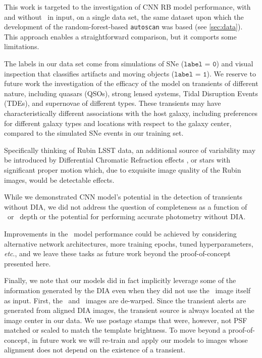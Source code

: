 This work is targeted to the investigation of CNN RB model performance, with and without \diff\ in input, on a single data set, the same dataset upon which the  development of the random-forest-based \texttt{autoscan} was based (see \autoref{sec:data}). This approach enables a straightforward comparison, but it comports some limitations. 

The labels in our data set come from simulations of SNe ($\texttt{label = 0}$) and visual inspection that classifies artifacts and moving objects ($\texttt{label = 1}$). We reserve to future work the investigation of the efficacy of the model on transients of different nature, including quasars (QSOs), strong lensed systems, Tidal Disruption Events (TDEs), and supernovae of different types.  These transients may have characteristically different associations with the host galaxy, including preferences for different galaxy types and locations with respect to the galaxy center, compared to the simulated SNe events in our training set. 

Specifically thinking of Rubin LSST data, an additional source of variability may be introduced by Differential Chromatic Refraction effects \citep{Abbott_2018, richards2018leveraging}, or stars with significant proper motion which, due to exquisite image quality of the Rubin images, would be detectable effects.

While we demonstrated CNN model's potential in the detection of transients without DIA, we did not address the question of completeness as a function of \search\ or \temp\ depth or the potential for performing accurate photometry without DIA. 

Improvements in the \nodia\ model performance could be achieved by considering %
alternative network architectures, more training epochs, tuned hyperparameters, {\it etc}., and we leave these tasks as future work beyond the proof-of-concept presented here. %

Finally, we note that our models did in fact implicitly leverage some of the information generated by the DIA even when they did not use the \diff\ image itself as input.  First, the \temp\ and \search\ images are de-warped. Since the transient alerts are generated from aligned DIA images, the transient source is always located at the image center in our data. We use postage stamps that were, however, not PSF matched or scaled to match the template brightness.
To move beyond a proof-of-concept, in future work we will re-train and apply our models to images whose alignment does not depend on the existence of a transient. %